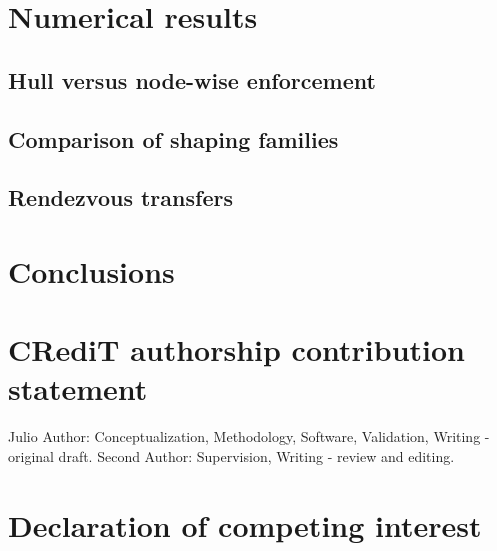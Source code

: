 \documentclass[a4paper,fleqn]{cas-sc}
\begin{document}
\section{Numerical results}
\label{sec:results}


\subsection{Hull versus node-wise enforcement}


\subsection{Comparison of shaping families}


\subsection{Rendezvous transfers}


\section{Conclusions}
\label{sec:conclusions}


\section*{CRediT authorship contribution statement}

Julio Author: Conceptualization, Methodology, Software, Validation, Writing - original draft. Second Author: Supervision, Writing - review and editing.

\section*{Declaration of competing interest}
\end{document}
